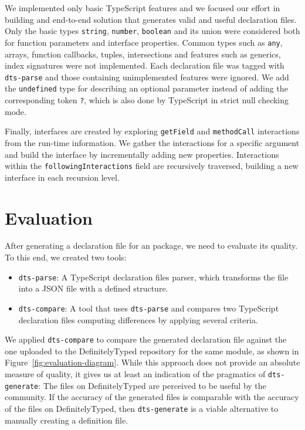 \documentclass[a4paper,english,cleveref, autoref]{lipics-v2019}
\newcommand{\figref}[1]{Figure~\ref{#1}}
\begin{document}
We implemented only basic TypeScript features and we focused our effort in building and end-to-end solution that generates valid and useful declaration files. Only the basic types \texttt{string}, \texttt{number}, \texttt{boolean} and its union were considered both for function parameters and interface properties. Common types such as \texttt{any}, arrays, function callbacks, tuples, intersections and features such as generics, index signatures were not implemented. Each declaration file was tagged with \texttt{dts-parse} and those containing unimplemented features were ignored. We add the \texttt{undefined} type for describing an optional parameter instead of adding the corresponding token \texttt{?}, which is also done by TypeScript in strict null checking mode\cite{typescript-optional-parameters-and-properties}.


Finally, interfaces are created by exploring \texttt{getField} and
\texttt{methodCall} interactions from the run-time information. We
gather the interactions for a specific argument and build the
interface by incrementally adding new properties. Interactions within
the \texttt{followingInteractions} field are recursively traversed,
building a new interface in each recursion level.

\section{Evaluation}
\label{sec:dts-generate-evaluation}
After generating a declaration file for an \NPM{} package, we need to
evaluate its quality. To this end, we created two tools:
\begin{itemize}
  \item \texttt{dts-parse}: A TypeScript declaration files parser, which transforms the file into a JSON file with a defined structure.
  \item \texttt{dts-compare}: A tool that uses \texttt{dts-parse} and compares two TypeScript declaration files computing differences by applying several criteria.
\end{itemize}

We applied \texttt{dts-compare} to compare the generated declaration file against the one uploaded to the DefinitelyTyped repository for the same module, as shown in \figref{fig:evaluation-diagram}. While this approach does not provide an absolute measure of quality, it gives us at least an indication of the pragmatics of \texttt{dts-generate}: The files on DefinitelyTyped
are perceived to be useful by the community. If the accuracy of the
generated files is comparable with the accuracy of the files on
DefinitelyTyped, then \texttt{dts-generate} is a viable alternative to
manually creating a definition file.
\end{document}
